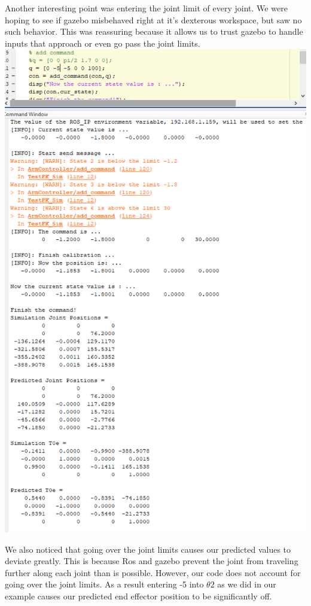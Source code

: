 \documentclass[12pt]{article}
\begin{document}
\par{
Another interesting point was entering the joint limit of every joint. We were hoping to see if gazebo misbehaved right at it's dexterous workspace, but saw no such behavior. This was reassuring because it allows us to trust gazebo to handle inputs that approach or even go pass the joint limits.
}
\includegraphics[scale=1]{interesting q case}
\par{
We also noticed that going over the joint limits causes our predicted values to deviate greatly. This is because Ros and gazebo prevent the joint from traveling further along each joint than is possible. However, our code does not account for going over the joint limits. As a result entering -5 into $\theta{2}$ as we did in our example causes our predicted end effector position to be significantly off.
}
\end{document}
